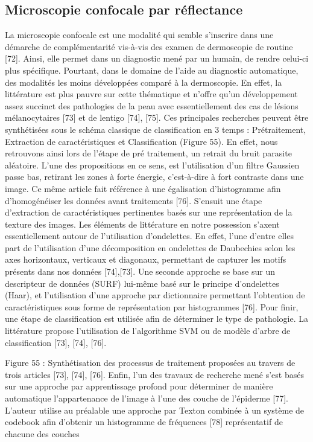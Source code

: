 \subsection{Microscopie confocale par réflectance}
La microscopie confocale est une modalité qui semble s’inscrire dans une démarche de complémentarité vis-à-vis des examen de dermoscopie de routine [72]. Ainsi, elle permet dans un diagnostic mené par un humain, de rendre celui-ci plus spécifique. Pourtant, dans le domaine de l’aide au diagnostic automatique, des modalités les moins développées comparé à la dermoscopie. En effet, la littérature est plus pauvre sur cette thématique et n’offre qu’un développement assez succinct des pathologies de la peau avec essentiellement des cas de lésions mélanocytaires [73] et de lentigo [74], [75].
Ces principales recherches peuvent être synthétisées sous le schéma classique de classification en 3 temps : Prétraitement, Extraction de caractéristiques et Classification (Figure 55). En effet, nous retrouvons ainsi lors de l’étape de pré traitement, un retrait du bruit parasite aléatoire. L’une des propositions en ce sens, est l’utilisation d’un filtre Gaussien passe bas, retirant les zones à forte énergie, c’est-à-dire à fort contraste dans une image. Ce même article fait référence à une égalisation d’histogramme afin d’homogénéiser les données avant traitements [76]. S’ensuit une étape d’extraction de caractéristiques pertinentes basés sur une représentation de la texture des images. Les éléments de littérature en notre possession s’axent essentiellement autour de l’utilisation d’ondelettes.  En effet, l’une d’entre elles part de l’utilisation d’une décomposition en ondelettes de Daubechies selon les axes horizontaux, verticaux et diagonaux, permettant de capturer les motifs présents dans nos données [74],[73]. Une seconde approche se base sur un descripteur de données (SURF) lui-même basé sur le principe d’ondelettes (Haar), et l’utilisation d’une approche par dictionnaire permettant l’obtention de caractéristiques sous forme de représentation par histogrammes [76]. Pour finir, une étape de classification est utilisée afin de déterminer le type de pathologie. La littérature propose l’utilisation de l’algorithme SVM ou de modèle d’arbre de classification [73], [74], [76].             
 
Figure 55 : Synthétisation des processus de traitement proposées au travers de trois articles  [73], [74], [76].
Enfin, l’un des travaux de recherche mené s’est basés sur une approche par apprentissage profond pour déterminer de manière automatique l’appartenance de l’image à l’une des couche de l’épiderme [77]. L’auteur utilise au préalable une approche par Texton combinée à un système de codebook afin d’obtenir un histogramme de fréquences [78] représentatif de chacune des couches

\cite{Wiltgen2008}
\cite{Halimi2017a}



